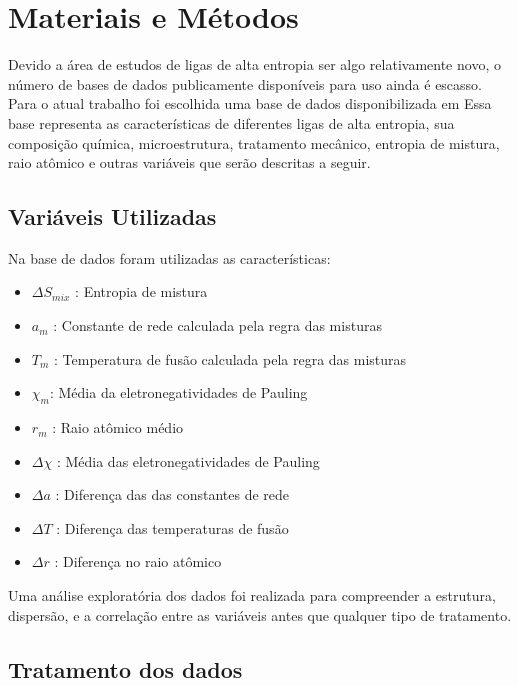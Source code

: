 \chapter{Materiais e Métodos}



 Devido a área de estudos de ligas de alta entropia ser algo relativamente novo, o número de bases de dados publicamente disponíveis para uso ainda é escasso. Para o atual trabalho foi escolhida uma base de dados disponibilizada em \cite{borg2020expanded} %
 Essa base representa as características de diferentes ligas de alta entropia, sua composição química, microestrutura, tratamento mecânico, entropia de mistura, raio atômico e outras variáveis que serão descritas a seguir.


\section{Variáveis Utilizadas}\label{sec:MAT_MET_SEC_A}

Na base de dados foram utilizadas as características:


\begin{itemize}
    \item $\Delta S_{mix}$ :  Entropia de mistura
    \item $a_{m}$ :  Constante de rede calculada pela regra das misturas
    \item $ T_{m}$ :  Temperatura de fusão calculada pela regra das misturas
    \item $\chi_{m} $:  Média da eletronegatividades de Pauling
    \item $r_{m} $ :  Raio atômico médio
    \item $\Delta \chi$ :  Média das eletronegatividades de Pauling
    \item $\Delta a$ :  Diferença das das constantes de rede
    \item $\Delta T$ :  Diferença das temperaturas de fusão
    \item $\Delta r$ : Diferença no raio atômico
\end{itemize}

Uma análise exploratória dos dados foi realizada para compreender a estrutura, dispersão, e a correlação entre as variáveis antes que qualquer tipo de tratamento.



\section{Tratamento dos dados}\label{sec:MAT_MET_SEC_B}
